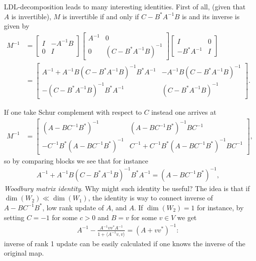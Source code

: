 LDL-decomposition leads to many interesting identities. First of all, (given that $A$ is invertible), $M$ is invertible if and only if $C - B^{*} A^{-1} B$ is and its inverse is given by
\begin{align*}
	M^{-1} &=
	\begin{bmatrix}
		I & -A^{-1} B \\
		0 & I
	\end{bmatrix}
	\begin{bmatrix}
		A^{-1} & 0 \\
		0 & (C - B^{*} A^{-1} B)^{-1}
	\end{bmatrix}
	\begin{bmatrix}
		I & 0 \\
		-B^{*} A^{-1}  & I
	\end{bmatrix} \\
	&=
	\begin{bmatrix}
		A^{-1} + A^{-1} B (C - B^{*} A^{-1} B)^{-1} B^{*} A^{-1} & -A^{-1} B (C - B^{*} A^{-1} B)^{-1} \\
		-(C - B^{*} A^{-1} B)^{-1} B^{*} A^{-1} & (C - B^{*} A^{-1} B)^{-1}
	\end{bmatrix}.
\end{align*}

If one take Schur complement with respect to $C$ instead one arrives at
\begin{align*}
	M^{-1}
	&=
	\begin{bmatrix}
		(A - B C^{-1} B^{*})^{-1} & (A - B C^{-1} B^{*})^{-1} B C^{-1} \\
		- C^{-1} B^{*} (A - B C^{-1} B^{*})^{-1} & C^{-1} + C^{-1} B^{*} (A - B C^{-1} B^{*})^{-1} B C^{-1}
	\end{bmatrix},
\end{align*}
so by comparing blocks we see that for instance
\begin{align}\label{woodbury_identity}
	A^{-1} + A^{-1} B (C - B^{*} A^{-1} B)^{-1} B^{*} A^{-1} = (A - B C^{-1} B^{*})^{-1},
\end{align}
\textit{Woodbury matrix identity}. Why might such identity be useful? The idea is that if $\dim(W_{2}) \ll \dim(W_{1})$, the identity is way to connect inverse of $A - B C^{-1} B^{*}$, low rank update of $A$, and $A$. If $\dim(W_{2}) = 1$ for instance, by setting $C = -1$ for some $c > 0$ and $B = v$ for some $v \in V$ we get
\begin{align*}
	A^{-1} - \frac{A^{-1} v v^{*} A^{-1}}{1 + \langle A^{-1}v, v\rangle} = (A + v v^{*})^{-1}:
\end{align*}
inverse of rank 1 update can be easily calculated if one knows the inverse of the original map.

